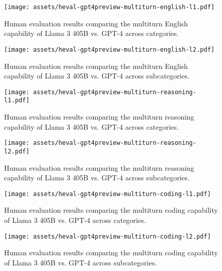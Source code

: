 \begin{figure}
    \centering
    \texttt{[image: assets/heval-gpt4preview-multiturn-english-l1.pdf]}
    \caption{Human evaluation results comparing the multiturn English capability of Llama 3 405B vs. GPT-4 across categories.}
    \label{fig:heval-gpt4o-multiturn-english-l1.png}
\end{figure}


\begin{figure}
    \centering
    \texttt{[image: assets/heval-gpt4preview-multiturn-english-l2.pdf]}
    \caption{Human evaluation results comparing the multiturn English capability of Llama 3 405B vs. GPT-4 across subcategories.}
    \label{fig:heval-gpt4o-multiturn-english-l2.png}
\end{figure}

\begin{figure}
    \centering
    \texttt{[image: assets/heval-gpt4preview-multiturn-reasoning-l1.pdf]}
    \caption{Human evaluation results comparing the multiturn reasoning capability of Llama 3 405B vs. GPT-4 across categories.}
    \label{fig:heval-gpt4o-multiturn-reasoning-l1.png}
\end{figure}


\begin{figure}
    \centering
    \texttt{[image: assets/heval-gpt4preview-multiturn-reasoning-l2.pdf]}
    \caption{Human evaluation results comparing the multiturn reasoning capability of Llama 3 405B vs. GPT-4 across subcategories.}
    \label{fig:heval-gpt4o-multiturn-reasoning-l2.png}
\end{figure}


\begin{figure}
    \centering
    \texttt{[image: assets/heval-gpt4preview-multiturn-coding-l1.pdf]}
    \caption{Human evaluation results comparing the multiturn coding capability of Llama 3 405B vs. GPT-4 across categories.}
    \label{fig:heval-gpt4o-multiturn-coding-l1.png}
\end{figure}


\begin{figure}
    \centering
    \texttt{[image: assets/heval-gpt4preview-multiturn-coding-l2.pdf]}
    \caption{Human evaluation results comparing the multiturn coding capability of Llama 3 405B vs. GPT-4 across subcategories.}
    \label{fig:heval-gpt4o-multiturn-coding-l2.png}
\end{figure}

